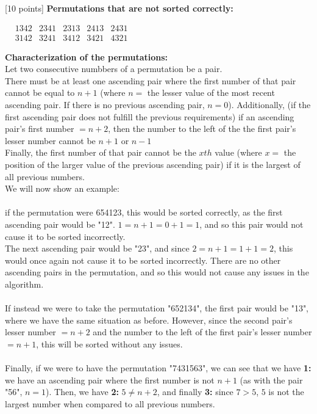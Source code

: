 \documentclass[12pt]{article}
\newcounter{ques}
\newenvironment{question}{\stepcounter{ques}{\noindent\bf Question \arabic{ques}:}}{\vspace{5mm}}
\begin{document}
\begin{question}[10 points]
\textbf{Permutations that are not sorted correctly:}\\
\begin{center}$
  \begin{matrix}
    &1342 &2341 &2313 &2413 &2431\\
    &3142 &3241 &3412 &3421 &4321
  \end{matrix}$
\end{center}


\textbf{Characterization of the permutations:}\\
Let two consecutive numbbers of a permutation be a pair.\\



There must be at least one ascending pair where the first number of that pair cannot be equal to $n+1$ (where $n=$ the lesser value of the most recent ascending pair. If there is no previous ascending pair, $n=0$). Additionally, (if the first ascending pair does not fulfill the previous requirements) if an ascending pair's first number $=n+2$, then the number to the left of the the first pair's lesser number cannot be $n+1$ or $n-1$\\
Finally, the first number of that pair cannot be the $xth$ value (where $x=$ the position of the larger value of the previous ascending pair) if it is the largest of all previous numbers.\\
We will now show an example:\\\\
if the permutation were 654123, this would be sorted correctly, as the first ascending pair would be "12". $1=n+1=0+1=1$, and so this pair would not cause it to be sorted incorrectly.\\
The next ascending pair would be "23", and since $2=n+1=1+1=2$, this would once again not cause it to be sorted incorrectly. There are no other ascending pairs in the permutation, and so this would not cause any issues in the algorithm.\\\\
If instead we were to take the permutation "652134", the first pair would be "13", where we have the same situation as before. However, since the second pair's lesser number $=n+2$ and the number to the left of the first pair's lesser number $=n+1$, this will be sorted without any issues.\\\\
Finally, if we were to have the permutation "7431563", we can see that we have \textbf{1:} we have an ascending pair where the first number is not $n+1$ (as with the pair "56", $n=1$). Then, we have \textbf{2:} $5\neq n+2$, and finally \textbf{3:} since $7>5$, $5$ is not the largest number when compared to all previous numbers.\\\\

\end{question}
\end{document}
